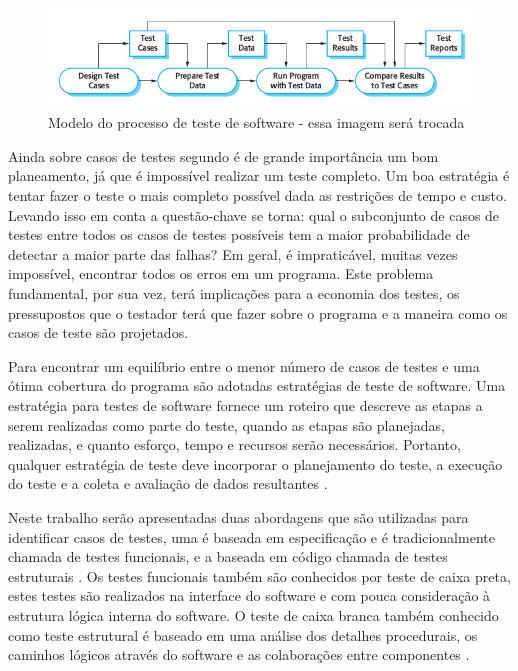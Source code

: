 \documentclass[dm,ppgcomp]{texfurg} %
\begin{document}
\begin{figure}[ht]
\centering
\includegraphics[scale=0.5]{imagens/fig8_3_v.png}
\caption{Modelo do processo de teste de software - essa imagem será trocada}
\label{fig:processo_teste}
\end{figure}

Ainda sobre casos de testes segundo \cite{myers2011art} é de grande importância um bom planeamento, já que é impossível realizar um teste completo. Um boa estratégia é tentar fazer o teste o mais completo possível dada as restrições de tempo e custo. Levando isso em conta a questão-chave se torna: qual o subconjunto de casos de testes entre todos os casos de testes possíveis tem a maior probabilidade de detectar a maior parte das falhas? Em geral, é impraticável, muitas vezes impossível, encontrar todos os erros em um programa. Este problema fundamental, por sua vez, terá implicações para a economia dos testes, os pressupostos que o testador terá que fazer sobre o programa e a maneira como os casos de teste são projetados.

Para encontrar um equilíbrio entre o menor número de casos de testes e uma ótima cobertura do programa são adotadas estratégias de teste de software. Uma estratégia para testes de software fornece um roteiro que descreve as etapas a serem realizadas como parte do teste, quando as etapas são planejadas, realizadas, e quanto esforço, tempo e recursos serão necessários. Portanto, qualquer estratégia de teste deve incorporar o planejamento do teste, a execução do teste e a coleta e avaliação de dados resultantes \cite{pressman2005software}.

Neste trabalho serão apresentadas duas abordagens que são utilizadas para identificar casos de testes, uma é baseada em especificação e é tradicionalmente chamada de testes funcionais, e a baseada em código chamada de testes estruturais \cite{jorgensen2016software}. Os testes funcionais também são conhecidos por teste de caixa preta, estes testes são realizados na interface do software e com pouca consideração à estrutura lógica interna do software. O teste de caixa branca também conhecido como teste estrutural é baseado em uma análise dos detalhes procedurais, os caminhos lógicos através do software e as colaborações entre componentes \cite{pressman2005software}.
\end{document}

